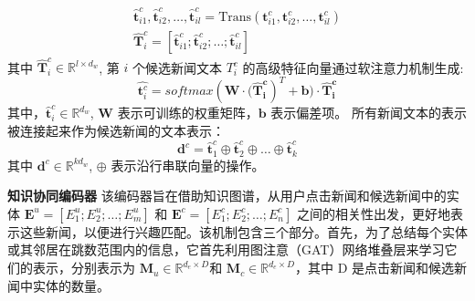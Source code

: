 \documentclass[withoutpreface,bwprint]{cumcmthesis} %
\begin{document}
	\begin{equation}\label{eta}
	\begin{split}
	\hat{\mathbf{t}} _{i1}^{c}, \hat{\mathbf{t}}_{i2}^{c}, \ldots, \hat{\mathbf{t}}_{il}^{c} =\mathrm{Trans} (\mathbf{t}^c_{i1},\mathbf{t}^c_{i2}, \ldots, \mathbf{t}^c_{il})\\
	\hat{\mathbf{T}}_i^c = [\hat{\mathbf{t}}_{i1}^{c}; \hat{\mathbf{t}}_{i2}^{c}; \ldots; \hat{\mathbf{t}}_{il}^{c}]
	\end{split}
	\end{equation}\label{eta}
	其中 $\hat{\mathbf{T}}^{c}_i \in \mathbb{R}^{l \times d_w}$, 
	第 $i$ 个候选新闻文本 $T_i^c$ 的高级特征向量通过软注意力机制生成: 
	\begin{equation}
	\hat{\mathbf{t}^c_i} = softmax( \mathbf{W} \cdot \mathbf{(\hat{\mathbf{T}}^c_i})^{T} + \mathbf{b}) \cdot \mathbf{\hat{\mathbf{T}}^c_i}
	\end{equation}
	其中，$\hat{\mathbf{t}}^c_i \in \mathbb{R}^{d_w}$, $\mathbf{W}$ 表示可训练的权重矩阵，$\mathbf{b}$ 表示偏差项。
	所有新闻文本的表示被连接起来作为候选新闻的文本表示：
	\begin{equation}\label{eta}
	\mathbf{d}^c= \hat{\mathbf{t}}_1^c \oplus \hat{\mathbf{t}}_2^c \oplus \ldots \oplus \hat{\mathbf{t}}_k^c
	\end{equation}\label{eta}
	其中 $\mathbf{d}^c \in \mathbb{R}^{kd_w}$, $\oplus$ 表示沿行串联向量的操作。\par
	\textbf{知识协同编码器 }
	该编码器旨在借助知识图谱，从用户点击新闻和候选新闻中的实体 $\mathbf{E}^{u} =[E^u_1;E^u_2;\dots;E^u_m] $ 和 $\mathbf{E}^{c} = [E^c_1;E^c_2;\dots;E^c_n] $ 之间的相关性出发，更好地表示这些新闻，以便进行兴趣匹配。该机制包含三个部分。首先，为了总结每个实体或其邻居在跳数范围内的信息，它首先利用图注意（GAT）网络堆叠层来学习它们的表示，分别表示为 $\mathbf{M}_u \in \mathbb{R}^{d_e \times D}$和 $\mathbf{M}_c \in \mathbb{R}^{d_e \times D}$，其中 D 是点击新闻和候选新闻中实体的数量。
	
\end{document}
